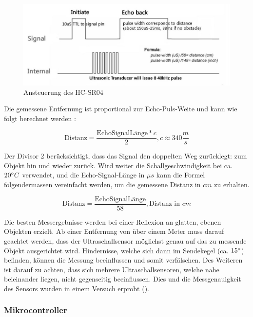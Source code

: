 \begin{figure}
    \centering
    \includegraphics[width=\linewidth]{pics/ultraschall-messung.jpg}
    \caption{Ansteuerung des HC-SR04}
    \label{fig:ultraschall-messung}
\end{figure}

Die gemessene Entfernung ist proportional zur Echo-Puls-Weite und kann wie folgt berechnet werden :

\begin{equation}
\text{Distanz} = \frac{\text{EchoSignalLänge} * c}{2}, c \approx 340 \frac{m}{s}
\end{equation}

Der Divisor 2 berücksichtigt, dass das Signal den doppelten Weg zurücklegt: zum Objekt hin und wieder zurück. Wird weiter die Schallgeschwindigkeit bei ca. $20\degree C$ verwendet, und die Echo-Signal-Länge in $\mu s$ kann die Formel folgendermassen vereinfacht werden, um die gemessene Distanz in $cm$ zu erhalten.

\begin{equation}
\text{Distanz} = \frac{\text{EchoSignalLänge}}{58}, \text{Distanz in } cm
\end{equation}

Die besten Messergebnisse werden bei einer Reflexion an glatten, ebenen Objekten erzielt. Ab einer Entfernung von über einem Meter muss darauf geachtet werden, dass der Ultraschallsensor möglichst genau auf das zu messende Objekt ausgerichtet wird. Hindernisse, welche sich dann im Sendekegel (ca. $15\degree$) befinden, können die Messung beeinflussen und somit verfälschen. Des Weiteren ist darauf zu achten, dass sich mehrere Ultraschallsensoren, welche nahe beieinander liegen, nicht gegenseitig beeinflussen. Dies und die Messgenauigkeit des Sensors wurden in einem Versuch erprobt ().

\subsubsection{Mikrocontroller}
\label{sec:mikrocontroller}

